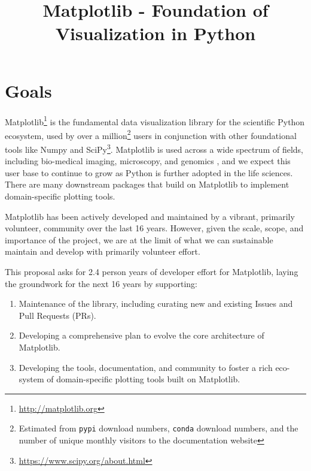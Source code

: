 \documentclass[11pt,letterpaper]{article}  %
\begin{document}
\title{Matplotlib - Foundation of Visualization in Python}
\author{}
\maketitle

\section{Goals}

Matplotlib\footnote{\url{http://matplotlib.org}} is the fundamental
data visualization library for the scientific Python ecosystem, used
by over a million\footnote{Estimated from \texttt{pypi} download
numbers, \texttt{conda} download numbers, and the number of unique
monthly visitors to the documentation website} users in conjunction
with other foundational tools like Numpy and
SciPy\footnote{\url{https://www.scipy.org/about.html}}.  Matplotlib is
used across a wide spectrum of fields, including bio-medical imaging,
microscopy, and genomics
\cite{Carpenter2006,Wolf2018,10.7717/peerj.453,
  Segata2011,10.1371/journal.pgen.1000695,HASHIMSHONY2012666,
  10.1093/bioinformatics/bts480,Carlile2014,Laganowsky2014,Jiangaac9462,
  10.3389/fninf.2014.00014}, and we expect this user base to continue
to grow as Python is further adopted in the life sciences.
There are
many downstream packages that build on Matplotlib to implement
domain-specific plotting tools.

Matplotlib has been actively developed and maintained by a vibrant,
primarily volunteer, community over the last 16 years.  However, given
the scale, scope, and importance of the project, we are at the limit
of what we can sustainable maintain and develop with primarily
volunteer effort.

This proposal asks for 2.4 person years of developer effort for
Matplotlib, laying the groundwork for the next 16 years by supporting:

\begin{enumerate}[label=\alph*),noitemsep]
  \item Maintenance of the library, including curating new and
    existing Issues and Pull Requests (PRs).
  \item Developing a comprehensive plan to evolve the core architecture
    of Matplotlib.
  \item Developing the tools, documentation, and community to foster a
    rich eco-system of domain-specific plotting tools built on
    Matplotlib.
\end{enumerate}
\end{document}
